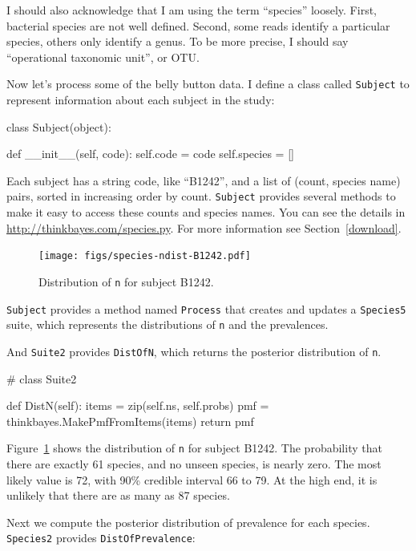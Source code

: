 \documentclass[12pt]{book}
\theoremstyle{exercise}
\begin{document}
I should also acknowledge that I am using the term ``species''
loosely.  First, bacterial species are not well defined.  Second,
some reads identify a particular species, others only identify
a genus.  To be more precise, I should say ``operational
taxonomic unit'', or OTU.

Now let's process some of the belly button data.  I define
a class called {\tt Subject} to represent information about
each subject in the study:

\begin{code}
class Subject(object):

    def __init__(self, code):
        self.code = code
        self.species = []
\end{code}

Each subject has a string code, like ``B1242'', and a list of
(count, species name) pairs, sorted in increasing order by count.
{\tt Subject} provides several methods to make it
easy to access these counts and species names.  You can see the details
in \url{http://thinkbayes.com/species.py}.
  For more information
see Section~\ref{download}.

\begin{figure}
\centerline{\texttt{[image: figs/species-ndist-B1242.pdf]}}
\caption{Distribution of {\tt n} for subject B1242.}
\label{species-ndist}
\end{figure}

{\tt Subject} provides a method named {\tt Process} that creates and
updates a {\tt Species5} suite,
which represents the distributions of {\tt n} and the prevalences.

And {\tt Suite2} provides {\tt DistOfN}, which returns the posterior
distribution of {\tt n}.

\begin{code}
# class Suite2

    def DistN(self):
        items = zip(self.ns, self.probs)
        pmf = thinkbayes.MakePmfFromItems(items)
        return pmf
\end{code}

Figure~\ref{species-ndist} shows the distribution of {\tt n} for
subject B1242.  The probability that there are exactly 61 species, and
no unseen species, is nearly zero.  The most likely value is 72, with
90\% credible interval 66 to 79.  At the high end, it is unlikely that
there are as many as 87 species.

Next we compute the posterior distribution of prevalence for
each species.  {\tt Species2} provides {\tt DistOfPrevalence}:
\end{document}
